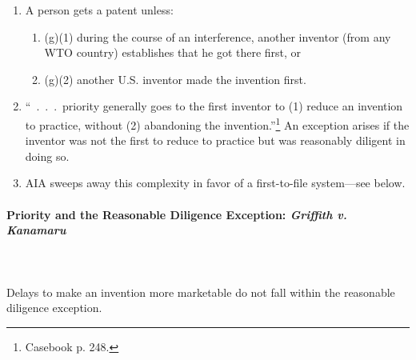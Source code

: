 \begin{enumerate}
    \item A person gets a patent unless:
    \begin{enumerate}
        \item (g)(1) during the course of an interference, another inventor (from 
        any WTO country) establishes that he got there first, or
        \item (g)(2) another U.S. inventor made the invention first.
    \end{enumerate}
    \item ``~.~.~.~priority generally goes to the first inventor to (1) reduce 
    an invention to practice, without (2) abandoning the 
    invention.''\footnote{Casebook p. 248.} An exception arises if the inventor 
    was not the first to reduce to practice but was reasonably diligent in doing 
    so.
    \item AIA sweeps away this complexity in favor of a first-to-file 
    system---see below. 
\end{enumerate}

\paragraph{Priority and the Reasonable Diligence Exception: \emph{Griffith v. 
Kanamaru}}
~\\\\
Delays to make an invention more marketable do not fall within the reasonable 
diligence exception.

